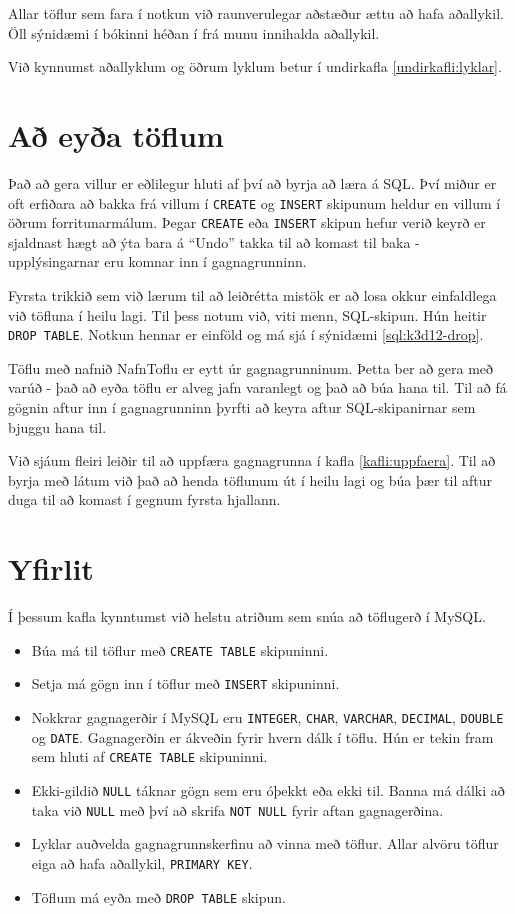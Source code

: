 Allar töflur sem fara í notkun við raunverulegar aðstæður ættu að hafa aðallykil. Öll sýnidæmi í bókinni héðan í frá munu innihalda aðallykil.

Við kynnumst aðallyklum og öðrum lyklum betur í undirkafla \ref{undirkafli:lyklar}.
\section{Að eyða töflum} %
Það að gera villur er eðlilegur hluti af því að byrja að læra á SQL. Því miður er oft erfiðara að bakka frá villum í \verb|CREATE| og \verb|INSERT| skipunum heldur en villum í öðrum forritunarmálum. Þegar \verb|CREATE| eða \verb|INSERT| skipun hefur verið keyrð er sjaldnast hægt að ýta bara á ``Undo'' takka til að komast til baka - upplýsingarnar eru komnar inn í gagnagrunninn.

Fyrsta trikkið sem við lærum til að leiðrétta mistök er að losa okkur einfaldlega við töfluna í heilu lagi. Til þess notum við, viti menn, SQL-skipun. Hún heitir \verb|DROP TABLE|. Notkun hennar er einföld og má sjá í sýnidæmi \ref{sql:k3d12-drop}.

\begin{example}
\caption[DROP TABLE]{Töflu með nafnið NafnToflu er eytt úr gagnagrunninum. Þetta ber að gera með varúð - það að eyða töflu er alveg jafn varanlegt og það að búa hana til. Til að fá gögnin aftur inn í gagnagrunninn þyrfti að keyra aftur SQL-skipanirnar sem bjuggu hana til.}
\label{sql:k3d12-drop}
\centering
{}
\end{example}

Við sjáum fleiri leiðir til að uppfæra gagnagrunna í kafla \ref{kafli:uppfaera}. Til að byrja með látum við það að henda töflunum út í heilu lagi og búa þær til aftur duga til að komast í gegnum fyrsta hjallann.

\section{Yfirlit}
Í þessum kafla kynntumst við helstu atriðum sem snúa að töflugerð í MySQL.

\begin{itemize}
 \item Búa má til töflur með \verb|CREATE TABLE| skipuninni.
 \item Setja má gögn inn í töflur með \verb|INSERT| skipuninni.
 \item Nokkrar gagnagerðir í MySQL eru \verb|INTEGER|, \verb|CHAR|, \verb|VARCHAR|, \verb|DECIMAL|, \verb|DOUBLE| og \verb|DATE|. Gagnagerðin er ákveðin fyrir hvern dálk í töflu. Hún er tekin fram sem hluti af \verb|CREATE TABLE| skipuninni.
 \item Ekki-gildið \verb|NULL| táknar gögn sem eru óþekkt eða ekki til. Banna má dálki að taka við \verb|NULL| með því að skrifa \verb|NOT NULL| fyrir aftan gagnagerðina.
 \item Lyklar auðvelda gagnagrunnskerfinu að vinna með töflur. Allar alvöru töflur eiga að hafa aðallykil, \verb|PRIMARY KEY|.
 \item Töflum má eyða með \verb|DROP TABLE| skipun.
\end{itemize}
